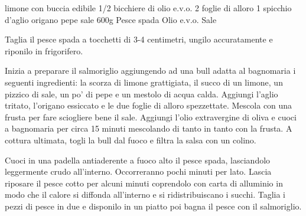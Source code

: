 \begin{ingreds}
	 limone con buccia edibile
	1/2 bicchiere di olio e.v.o.
	2 foglie di alloro
	1 spicchio d'aglio
	origano
	pepe
	sale
\columnbreak
     	600g Pesce spada
     	Olio e.v.o.
	Sale
\end{ingreds}

\begin{method}
Taglia il pesce spada a tocchetti di 3-4 centimetri, ungilo accuratamente e riponilo in frigorifero.

Inizia a preparare il salmoriglio aggiungendo ad una bull adatta al bagnomaria i seguenti ingredienti: la scorza di limone grattigiata, il succo di un limone, un pizzico di sale, un po' di pepe e un mestolo di acqua calda. Aggiungi l'aglio tritato, l'origano essiccato e le due foglie di alloro spezzettate. Mescola con una frusta per fare sciogliere bene il sale. Aggiungi l'olio extravergine di oliva e cuoci a bagnomaria per circa 15 minuti mescolando di tanto in tanto con la frusta. A cottura ultimata, togli la bull dal fuoco e filtra la salsa con un colino.

Cuoci in una padella antiaderente a fuoco alto il pesce spada, lasciandolo leggermente crudo all'interno. Occorreranno pochi minuti per lato. Lascia riposare il pesce cotto per alcuni minuti coprendolo con carta di alluminio in modo che il calore si diffonda all'interno e si ridistribuiscano i succhi. Taglia i pezzi di pesce in due e disponilo in un piatto poi bagna il pesce con il salmoriglio.

\end {method}



